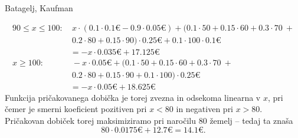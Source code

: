 \begin{naloga}{Batagelj, Kaufman}{\cite[Naloga~4.2]{bk}}
\begin{odgovor}
\begin{align*}
90 \le x \le 100: &\ x \cdot (0.1 \cdot 0.1 € - 0.9 \cdot 0.05 €) +
                     (0.1 \cdot 50 + 0.15 \cdot 60 + 0.3 \cdot 70 \ + \\
                  &\  0.2 \cdot 80 + 0.15 \cdot 90) \cdot 0.25 € +
                     0.1 \cdot 100 \cdot 0.1 € \\
                  &= -x \cdot 0.035 € + 17.125 € \\
x \ge 100:        &\ -x \cdot 0.05 € +
                     (0.1 \cdot 50 + 0.15 \cdot 60 + 0.3 \cdot 70 \ + \\
                  &\  0.2 \cdot 80 + 0.15 \cdot 90 + 0.1 \cdot 100)
                     \cdot 0.25 € \\
                  &= -x \cdot 0.05 € + 18.625 €
\end{align*}
Funkcija pričakovanega dobička je torej zvezna in odsekoma linearna v $x$,
pri čemer je smerni koeficient pozitiven pri $x < 80$
in negativen pri $x > 80$.
Pričakovan dobiček torej maksimiziramo pri naročilu $80$ žemelj
-- tedaj ta znaša
$$
80 \cdot 0.0175 € + 12.7 € = 14.1 € .
$$
\end{odgovor}
\end{naloga}
